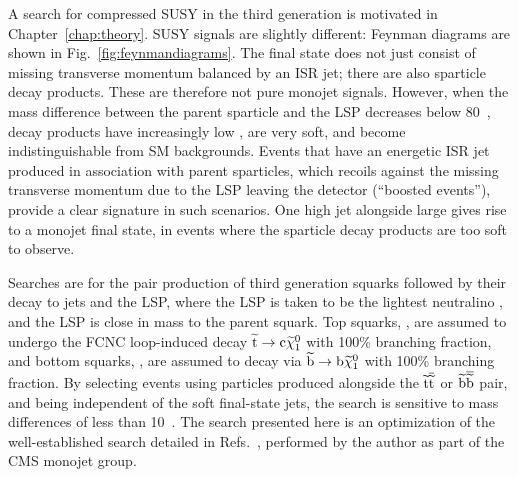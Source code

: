 A search for compressed \ac{SUSY} in the third generation is motivated in Chapter~\ref{chap:theory}.
\ac{SUSY} signals are slightly different: Feynman diagrams are shown in Fig.~\ref{fig:feynmandiagrams}. 
The final state does not just consist of missing transverse momentum balanced by an ISR jet; 
there are also sparticle decay products.
These are therefore not pure monojet signals.
However, when the mass difference between the parent sparticle and the \ac{LSP} decreases below 80~\GeV, decay products have increasingly low \pt, are very soft, 
and become indistinguishable from \ac{SM} backgrounds.
Events that have an energetic \ac{ISR} jet produced in association with parent sparticles, which recoils against the missing transverse momentum due to the LSP leaving the detector (``boosted events''),
provide a clear signature in such scenarios.
One high \pt{} jet alongside large \MET gives rise to a monojet final state, in events where the sparticle decay products are too soft to observe.


Searches are for the pair production of 
third generation squarks followed by their decay to jets and the LSP, where the LSP is taken to be the lightest neutralino \chiOneZero, 
and the LSP is close in mass to the parent squark.
Top squarks, \sTop, are assumed to undergo the \ac{FCNC} loop-induced decay $\widetilde{{\rm t}} \rightarrow {\rm c} \widetilde{\chi}^{0}_{1}$ with 100\% branching fraction, and
bottom squarks, \sBot, are assumed to decay via 
$\widetilde{{\rm b}} \rightarrow {\rm b} \widetilde{\chi}^{0}_{1}$ with 100\% branching fraction.
By selecting events using particles produced alongside the $\widetilde{{\rm t}}\overline{\widetilde{\mathrm{t}}}$ or $\widetilde{{\rm b}}\overline{\widetilde{\mathrm{b}}}$ pair, and being independent of the soft final-state jets, the search is sensitive to mass differences of less than 10~\GeV.
The search presented here is an optimization of the well-established search detailed in Refs.~\cite{bib:CMSEXO12048,bib:CMS_EXO11003,bib:CMSEXO11059}, performed by the author as part of the CMS monojet group.


